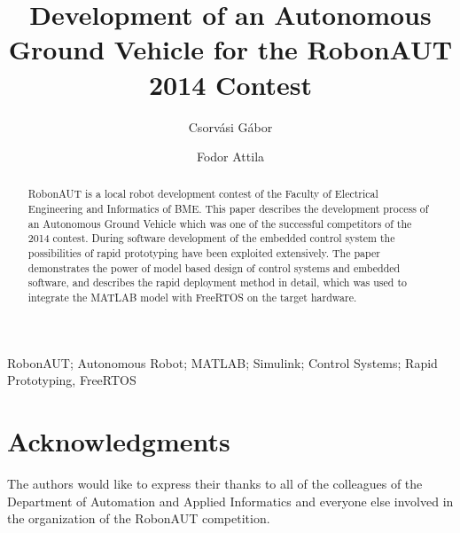 \documentclass[twoside,b5paper,10pt]{article}
\title{Development of an Autonomous Ground Vehicle for the RobonAUT 2014 Contest}
\author{Csorvási Gábor \and Fodor Attila}
\begin{document}
\makeAutStyleTitle


\begin{abstract}
RobonAUT is a local robot development contest of the Faculty of Electrical Engineering and Informatics of BME. This paper describes the development process of an Autonomous Ground Vehicle which was one of the successful competitors of the 2014 contest. During software development of the embedded control system the possibilities of rapid prototyping have been exploited extensively. The paper demonstrates the power of model based design of control systems and embedded software, and describes the rapid deployment method in detail, which was used to integrate the MATLAB model with FreeRTOS on the target hardware.
\end{abstract}


\begin{keywords}
RobonAUT; Autonomous Robot; MATLAB; Simulink; Control Systems; Rapid Prototyping, FreeRTOS
\end{keywords}






\section*{Acknowledgments}


 { \small The authors would like to express their thanks to all of the colleagues of the Department of Automation and Applied Informatics and everyone else involved in the organization of the RobonAUT competition. }

%

\end{document}
